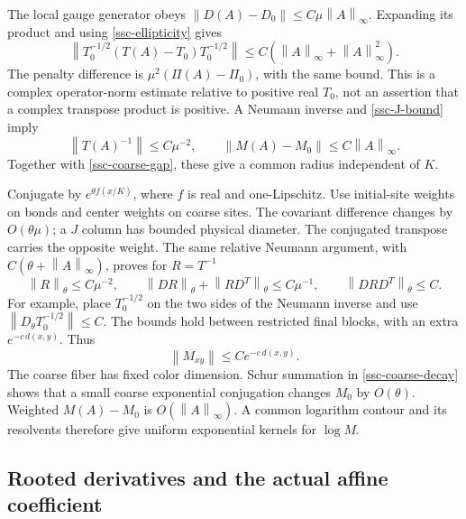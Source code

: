\documentclass[11pt]{article}
\newcommand{\norm}[1]{\left\lVert#1\right\rVert}
\theoremstyle{remark}
\begin{document}
The local gauge generator obeys
\(\norm{D(A)-D_0}\le C\mu\norm A_\infty\). Expanding its product
and using \eqref{ssc-ellipticity} gives
\begin{equation}
 \norm{T_0^{-1/2}(T(A)-T_0)T_0^{-1/2}}
       \le C(\norm A_\infty+\norm A_\infty^2).
 \label{ssc-relative}
\end{equation}
The penalty difference is \(\mu^2(\Pi(A)-\Pi_0)\), with the same
bound. This is a complex operator-norm estimate relative to positive
real \(T_0\), not an assertion that a complex transpose product is
positive. A Neumann inverse and \eqref{ssc-J-bound} imply
\[
 \norm{T(A)^{-1}}\le C\mu^{-2},\qquad
 \norm{M(A)-M_0}\le C\norm A_\infty .
\]
Together with \eqref{ssc-coarse-gap}, these give a common radius
independent of \(K\).

Conjugate by \(e^{\theta f(x/K)}\), where \(f\) is real and
one-Lipschitz. Use initial-site weights on bonds and center weights
on coarse sites. The covariant difference changes by \(O(\theta\mu)\);
a \(J\) column has bounded physical diameter. The conjugated
transpose carries the opposite weight. The same relative Neumann
argument, with \(C(\theta+\norm A_\infty)\), proves for \(R=T^{-1}\)
\begin{equation}
 \norm R_\theta\le C\mu^{-2},\qquad
 \norm{DR}_\theta+\norm{RD^T}_\theta\le C\mu^{-1},
 \qquad \norm{DRD^T}_\theta\le C .
 \label{ssc-weighted-energy}
\end{equation}
For example, place \(T_0^{-1/2}\) on the two sides of the Neumann
inverse and use \(\norm{D_\theta T_0^{-1/2}}\le C\).
The bounds hold between restricted final blocks, with an extra
\(e^{-c\,d(x,y)}\). Thus
\begin{equation}
 \norm{M_{xy}}\le Ce^{-c\,d(x,y)}.
 \label{ssc-coarse-decay}
\end{equation}
The coarse fiber has fixed color dimension. Schur summation in
\eqref{ssc-coarse-decay} shows that a small coarse exponential
conjugation changes \(M_0\) by \(O(\theta)\). Weighted \(M(A)-M_0\)
is \(O(\norm A_\infty)\). A common logarithm contour and its
resolvents therefore give uniform exponential kernels for \(\log M\).

\subsection{Rooted derivatives and the actual affine coefficient}
\end{document}
